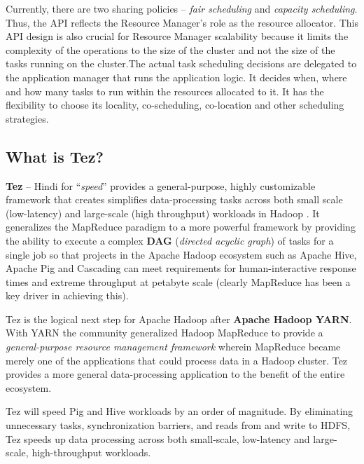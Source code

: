 \documentclass[twocolumn]{article}
\begin{document}
Currently, there are two sharing policies – \textit{fair scheduling} and \textit{capacity scheduling}. Thus, the API reflects the Resource Manager’s role as the resource allocator. This API design is also crucial for Resource Manager scalability because it limits the complexity of the operations to the size of the cluster and not the size of the tasks running on the cluster.The actual task scheduling decisions are delegated to the application manager that runs the application logic. It decides when, where and how many tasks to run within the resources allocated to it. It has the flexibility to choose its locality, co-scheduling, co-location and other scheduling strategies.

\subsection{What is Tez?}

\textbf{Tez} -- Hindi for ``\emph{speed}'' provides a general-purpose, highly customizable
framework that creates simplifies data-processing tasks across both
small scale (low-latency) and large-scale (high throughput) workloads in
Hadoop \cite{Saha:2013-01}. It generalizes the MapReduce paradigm to a more powerful
framework by providing the ability to execute a complex \textbf{DAG}
(\emph{directed acyclic graph}) of tasks for a single job so that
projects in the Apache Hadoop ecosystem such as Apache Hive, Apache Pig
and Cascading can meet requirements for human-interactive response times
and extreme throughput at petabyte scale (clearly MapReduce has been a
key driver in achieving this).

Tez is the logical next step for Apache Hadoop after \textbf{Apache
Hadoop YARN}. With YARN the community generalized Hadoop MapReduce to
provide a \emph{general-purpose resource management framework} wherein
MapReduce became merely one of the applications that could process data
in a Hadoop cluster. Tez provides a more general data-processing
application to the benefit of the entire ecosystem.

Tez will speed Pig and Hive workloads by an order of magnitude. By
eliminating unnecessary tasks, synchronization barriers, and reads from
and write to HDFS, Tez speeds up data processing across both
small-scale, low-latency and large-scale, high-throughput workloads.
\end{document}
